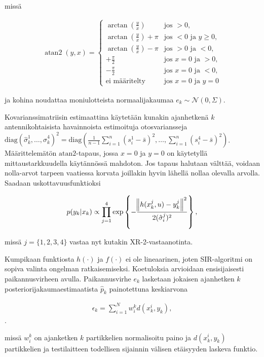\documentclass[
  12pt,
  a4paper, twoside]{book}
\begin{document}
\noindent missä

\begin{align}\label{atan2}
\displaystyle \operatorname{atan2}(y,x)={\begin{cases}\arctan({\frac {y}{x}})&{\text{jos }}>0,\\\arctan({\frac {y}{x}})+\pi &{\text{jos }}<0{\text{ ja }}y\geq 0,\\\arctan({\frac {y}{x}})-\pi & {\text{jos }}>0{\text{ ja }}<0,\\+{\frac {\pi }{2}}&{\text{jos }}x=0{\text{ ja }}>0,\\-{\frac {\pi }{2}}&{\text{jos }}x=0{\text{ ja }}<0,\\{\text{ei määritelty}}&{\text{jos }}x=0{\text{ ja }}y=0\end{cases}}
\end{align}

\noindent ja kohina noudattaa moniulotteista normaalijakaumaa \(e_k\sim\mathcal{N}(0,{\Sigma})\).

Kovarianssimatriisin estimaattina käytetään kunakin ajanhetkenä \(k\) antennikohtaisista havainnoista estimoituja otosvariansseja \(\text{diag}(\hat{\sigma}^1_k,\ldots,\hat{\sigma}^4_k)^2=\text{diag}(\frac{1}{n-1}\sum_{i=1}^n(s_i^1-\bar{s})^2,\ldots,\sum_{i=1}^n(s_i^4-\bar{s})^2)\). Määrittelemätön \(\text{atan2}\)-tapaus, jossa \(x=0\) ja \(y=0\) on käytetyllä mittaustarkkuudella käytännössä mahdoton. Jos tapaus halutaan välttää, voidaan nolla-arvot tarpeen vaatiessa korvata joillakin hyvin lähellä nollaa olevalla arvolla. Saadaan uskottavuusfunktioksi

\begin{align}
p(y_k|x_k)\propto\prod_{j=1}^4\exp\left\{-\frac{\norm{h(x^j_k,u)-y^j_k}^2}{2(\hat{\sigma}_i^j)^2}\right\},
\end{align}

\noindent missä \(j=\{1,2,3,4\}\) vastaa nyt kutakin XR-2-vastaanotinta.

Kumpikaan funktiosta \(h(\cdot)\) ja \(f(\cdot)\) ei ole lineaarinen, joten SIR-algoritmi on sopiva valinta ongelman ratkaisemiseksi. Koetuloksia arvioidaan ensisijaisesti paikannusvirheen avulla. Paikannusvirhe \(e_k\) lasketaan jokaisen ajanhetken \(k\) posteriorijakaumaestimaatista \(\hat{p}_k\) painotettuna keskiarvona

\begin{align}
\epsilon_k = \sum_{i=1}^Nw^k_i d(x^i_k, y_k),
\end{align}.

\noindent missä \(w_i^k\) on ajanketken \(k\) partikkelien normalisoitu paino ja \(d(x^i_k,y_k)\) partikkelien ja testilaitteen todellisen sijainnin välisen etäisyyden laskeva funktio.
\end{document}
